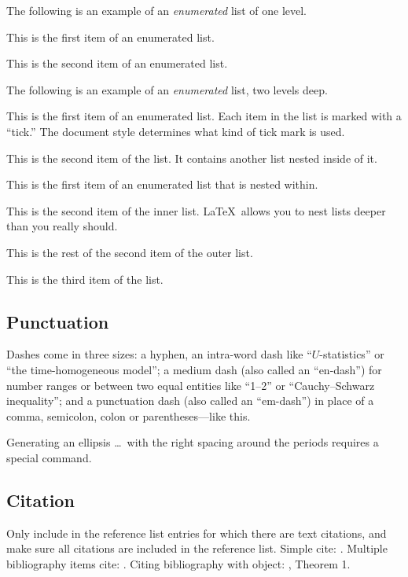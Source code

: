 \documentclass[aap]{imsart}
\theoremstyle{plain}
\theoremstyle{definition}
\begin{document}
The following is an example of an \emph{enumerated} list of one level.

\begin{longlist}
\item This is the first item of an enumerated list.
\item This is the second item of an enumerated list.
\end{longlist}

The following is an example of an \emph{enumerated} list, two levels deep.
\begin{longlist}
\item[1.]
This is the first item of an enumerated list.  Each item
in the list is marked with a ``tick.''  The document
style determines what kind of tick mark is used.
\item[2.]
This is the second item of the list.  It contains another
list nested inside of it.
\begin{longlist}
\item
This is the first item of an enumerated list that
is nested within.
\item
This is the second item of the inner list.  \LaTeX\
allows you to nest lists deeper than you really should.
\end{longlist}
This is the rest of the second item of the outer list.
\item[3.]
This is the third item of the list.
\end{longlist}

\subsection{Punctuation}
Dashes come in three sizes: a hyphen, an intra-word dash like ``$U$-statistics'' or ``the time-homogeneous model'';
a medium dash (also called an ``en-dash'') for number ranges or between two equal entities like ``1--2'' or ``Cauchy--Schwarz inequality'';
and a punctuation dash (also called an ``em-dash'') in place of a comma, semicolon,
colon or parentheses---like this.

Generating an ellipsis \ldots\ with the right spacing
around the periods requires a special command.

\subsection{Citation}
Only include in the reference list entries for which there are text citations,
and make sure all citations are included in the reference list.
Simple cite: \cite{r1}.
Multiple bibliography items cite: \cite{r1,r2,r3,r4}.
Citing bibliography with object: \cite{r1}, Theorem 1.
\end{document}
